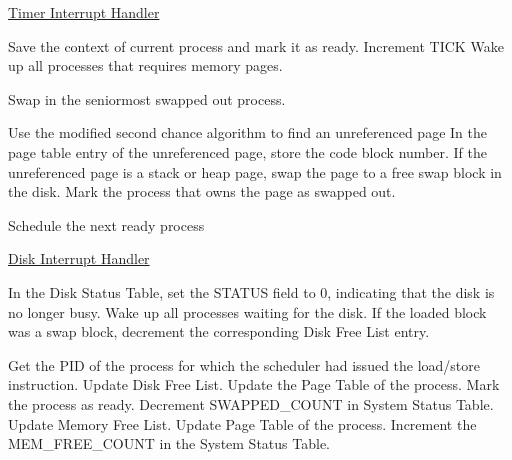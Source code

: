\begin{algorithm}
\caption{\href{http://exposnitc.github.io/os_design-files/timer.html}{Timer Interrupt Handler}}
\begin{algorithmic}
\STATE Save the context of current process and mark it as ready.
\STATE Increment TICK   
        \STATE Wake up all processes that requires memory pages.
    \ELSE
        
           
            \STATE Swap in the seniormost swapped out process.
           
        \ENDIF
    \ENDIF
\ELSE
      
            \STATE Use the modified second chance algorithm to find an unreferenced page 
                \STATE In the page table entry of the unreferenced page, store the code block number.
            \ELSE
                \STATE If the unreferenced page is a stack or heap page, swap the page to a free swap block in the disk.
            \ENDIF
                \STATE Mark the process that owns the page as swapped out.
            \ENDIF
        
   \ENDIF
  
\ENDIF
\STATE Schedule the next ready process


\end{algorithmic}
\end{algorithm}


\begin{algorithm}
\caption{\href{http://exposnitc.github.io/os_design-files/disk_interrupt.html}{Disk Interrupt Handler}}
\begin{algorithmic}
\STATE In the Disk Status Table, set the STATUS field to 0, indicating that the disk is no longer busy.
    \STATE Wake up all processes waiting for the disk.
    \STATE If the loaded block was a swap block, decrement the corresponding Disk Free List entry.
\ELSE
   
    \STATE Get the PID of the process for which the scheduler had issued the load/store instruction.
        \STATE Update Disk Free List.
        \STATE Update the Page Table of the process.
        \STATE Mark the process as ready. 
        \STATE Decrement SWAPPED\_COUNT in System Status Table.
    \ELSE 
        \STATE Update Memory Free List.
        \STATE Update Page Table of the process.
        \STATE Increment the MEM\_FREE\_COUNT in the System Status Table.
    \ENDIF
\ENDIF
\end{algorithmic}
\end{algorithm}

